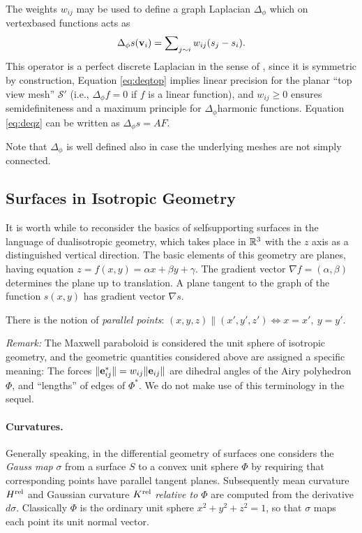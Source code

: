 \documentclass[review]{acmsiggraph}
\def\rel{{\mathord{{\rm rel}}}}
\def\SS{{\mathcal S}}
\begin{document}
The weights $w_{ij}$ may be used to define a graph Laplacian $\Delta_\phi$ 
which on vertex\dash based functions acts as
	\begin{align*}
	\Delta_{\phi} s({\mathbf v}_i)=\sum\nolimits_{j\sim i} w_{ij}(s_j-s_i).
	\end{align*}
 This operator is a perfect discrete Laplacian in the sense of 
\cite{wardetzky07}, since it is symmetric by construction, Equation 
\eqref{eq:deqtop} implies linear precision for the planar ``top view 
mesh'' $\SS'$ (i.e., $\Delta_\phi f=0$ if $f$ is a linear function), and 
$w_{ij}\ge 0$ ensures semidefiniteness and a maximum principle for 
$\Delta_\phi$\dash harmonic functions. Equation \eqref{eq:deqz} can be 
written as $\Delta_\phi s = AF$.

Note that $\Delta_\phi$ is well defined also in case the underlying meshes 
are not simply connected.

\subsection{Surfaces in Isotropic Geometry} \label{sec:smooth}

It is worth while to reconsider the basics of self\dash supporting surfaces 
in the language of dual\dash isotropic geometry, which takes place in 
${\mathbb R}^3$ with the $z$ axis as a distinguished vertical direction. The basic 
elements of this geometry are planes, having equation $z=f(x,y) = \alpha 
x+\beta y+\gamma$. The gradient vector $\nabla f = (\alpha,\beta)$ 
determines the plane up to translation. A plane tangent to the graph of 
the function $s(x,y)$ has gradient vector $\nabla s$.

There is the notion of {\em parallel points}:
	$
	(x,y,z) \parallel (x',y',z') \iff
	x=x',\ y=y'
	.$

{\it Remark:} The Maxwell paraboloid is considered the unit sphere of isotropic 
geometry, and the geometric quantities considered above are assigned
a specific meaning: The forces $\|{\mathbf e}_{ij}^*\|=w_{ij}\|{\mathbf e}_{ij}\|$
are dihedral angles of the Airy polyhedron $\Phi$, and ``lengths'' of
edges of $\Phi^*$. We do not make use of this terminology in the sequel.

\paragraph{Curvatures.}

Generally speaking, in the differential geometry of surfaces one considers 
the {\em Gauss map} $\sigma$ from a surface $S$ to a convex unit sphere 
$\Phi$ by requiring that corresponding points have parallel tangent 
planes.  Subsequently mean curvature $H^\rel$ and Gaussian curvature 
$K^\rel$ {\em relative to $\Phi$} are computed from the derivative 
$d\sigma$. Classically $\Phi$ is the ordinary unit sphere $x^2+y^2+z^2=1$, 
so that $\sigma$ maps each point its unit normal vector.
\end{document}

